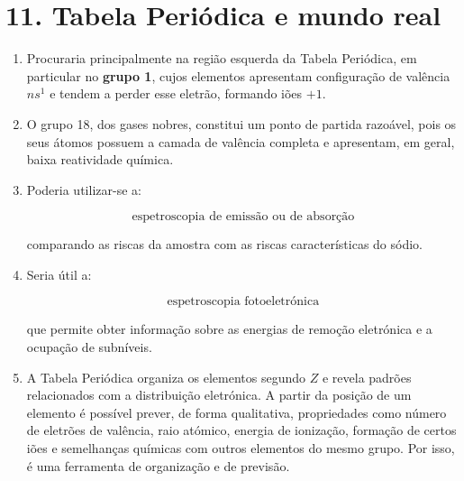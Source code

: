 \documentclass[11pt,a4paper]{article}
\newcounter{exercicio}
\newenvironment{resolucao}[1]
{
\refstepcounter{exercicio}
\begin{tcolorbox}[
    enhanced,
    breakable,
    colback=white,
    colframe=eublue,
    boxrule=0.8pt,
    arc=2mm,
    left=3mm,
    right=3mm,
    top=2mm,
    bottom=2mm,
    title={\textbf{Exercício \theexercicio}\hspace{1mm}--\hspace{1mm}#1},
    coltitle=white,
    colbacktitle=eublue,
    fonttitle=\bfseries
]
}
{
\end{tcolorbox}
}
\begin{document}
\section*{\textcolor{eugreen}{11. Tabela Periódica e mundo real}}

\begin{resolucao}{Escolher um elemento para uma aplicação}

\begin{enumerate}[label=\alph*)]

\item Procuraria principalmente na região esquerda da Tabela Periódica, em particular no \textbf{grupo 1}, cujos elementos apresentam configuração de valência \(ns^1\) e tendem a perder esse eletrão, formando iões \(+1\).

\item O grupo 18, dos gases nobres, constitui um ponto de partida razoável, pois os seus átomos possuem a camada de valência completa e apresentam, em geral, baixa reatividade química.

\item Poderia utilizar-se a:

\[
\boxed{\text{espetroscopia de emissão ou de absorção}}
\]

comparando as riscas da amostra com as riscas características do sódio.

\item Seria útil a:

\[
\boxed{\text{espetroscopia fotoeletrónica}}
\]

que permite obter informação sobre as energias de remoção eletrónica e a ocupação de subníveis.

\item A Tabela Periódica organiza os elementos segundo \(Z\) e revela padrões relacionados com a distribuição eletrónica. A partir da posição de um elemento é possível prever, de forma qualitativa, propriedades como número de eletrões de valência, raio atómico, energia de ionização, formação de certos iões e semelhanças químicas com outros elementos do mesmo grupo. Por isso, é uma ferramenta de organização e de previsão.

\end{enumerate}

\end{resolucao}

\end{document}
